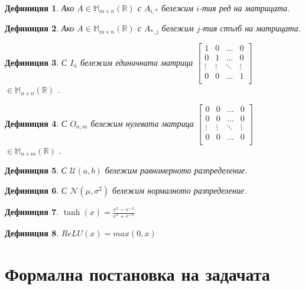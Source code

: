 \documentclass[a4paper,12pt]{article}
\newtheorem{defn}{Дефиниция}[section]
\begin{document}
\begin{defn}
Ако $A \in \mathbb{M}_{m \times n} (\mathbb{R})$ с $A_{i, *}$ бележим $i$-тия ред на матрицата.
\end{defn}

\begin{defn}
Ако $A \in \mathbb{M}_{m \times n} (\mathbb{R})$ с $A_{*, j}$ бележим $j$-тия стълб на матрицата.
\end{defn}

\begin{defn}
С $I_n$ бележим единичната матрица $\begin{bmatrix}
  1      & 0      & \dots  & 0 \\ 
  0      & 1      & \dots  & 0 \\ 
  \vdots & \vdots & \ddots & \vdots \\
  0      & 0      & \dots  & 1 \\ 
\end{bmatrix}$ $\in \mathbb{M}_{n \times n} (\mathbb{R})$ .
\end{defn}

\begin{defn}
С $O_{n,m}$ бележим нулевата матрица $\begin{bmatrix}
  0      & 0      & \dots  & 0 \\ 
  0      & 0      & \dots  & 0 \\ 
  \vdots & \vdots & \ddots & \vdots \\
  0      & 0      & \dots  & 0 \\ 
\end{bmatrix}$ $\in \mathbb{M}_{n \times m} (\mathbb{R})$ .
\end{defn}

\begin{defn}
С $\mathcal{U}(a,b)$ бележим равномерното разпределение.
\end{defn}

\begin{defn}
С $\mathcal{N}(\mu, \sigma^2)$ бележим нормалното разпределение.
\end{defn}

\begin{defn}
$\tanh(x) = \frac{e^x - e^{-x}}{e^x + e^{-x}}$
\end{defn}

\begin{defn} $ReLU(x)= max(0, x)$
\end{defn}

\pagebreak


\section{Формална постановка на задачата}
\end{document}
